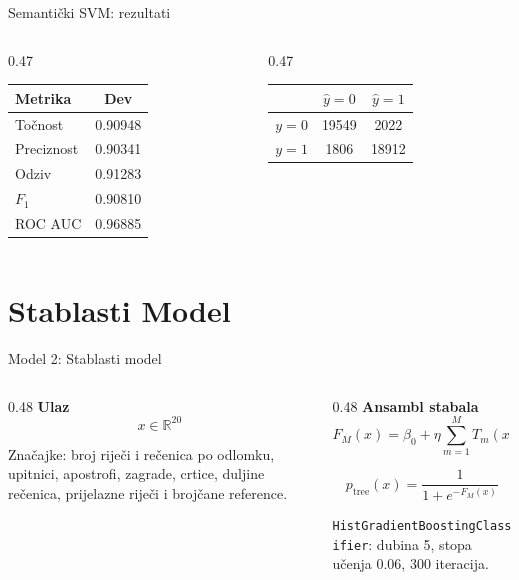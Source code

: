 \documentclass[aspectratio=169]{beamer}
\begin{document}
\begin{frame}{Semantički SVM: rezultati}
    \centering
    \begin{columns}[T]
        \begin{column}{0.47\textwidth}
            \centering
            \small
            \begin{tabular}{@{}lc@{}}
                \toprule
                \textbf{Metrika} & \textbf{Dev} \\ \midrule
                Točnost & 0.90948 \\
                Preciznost & 0.90341 \\
                Odziv & 0.91283 \\
                $F_1$ & 0.90810 \\
                ROC AUC & 0.96885 \\ \bottomrule
            \end{tabular}
        \end{column}
        \begin{column}{0.47\textwidth}
            \centering
            \small
            \begin{tabular}{@{}lcc@{}}
                \toprule
                & $\hat y=0$ & $\hat y=1$ \\ \midrule
                $y=0$ & 19549 & 2022 \\
                $y=1$ & 1806 & 18912 \\ \bottomrule
            \end{tabular}
        \end{column}
    \end{columns}
\end{frame}

\section{Stablasti Model}

\begin{frame}{Model 2: Stablasti model}
    \begin{columns}[T]
        \begin{column}{0.48\textwidth}
            \textbf{Ulaz}
            \[
                x\in\mathbb{R}^{20}
            \]

            \small
            Značajke: broj riječi i rečenica po odlomku, upitnici, apostrofi, zagrade, crtice, duljine rečenica, prijelazne riječi i brojčane reference.
        \end{column}
        \begin{column}{0.48\textwidth}
            \textbf{Ansambl stabala}
            \[
                F_M(x)=\beta_0+\eta\sum_{m=1}^{M}T_m(x)
            \]

            \[
                p_{\mathrm{tree}}(x)=\frac{1}{1+e^{-F_M(x)}}
            \]

            \small \texttt{HistGradientBoostingClassifier}: dubina 5, stopa učenja 0.06, 300 iteracija.
        \end{column}
    \end{columns}
\end{frame}
\end{document}
